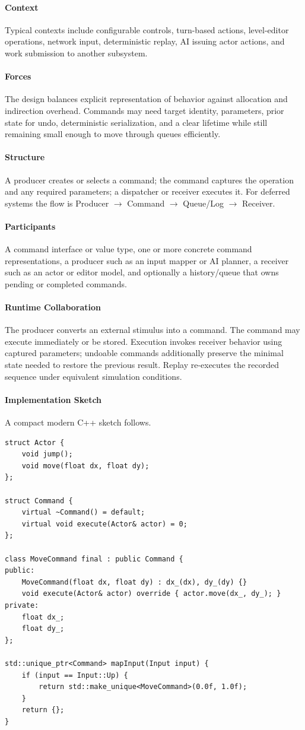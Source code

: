 \documentclass[11pt]{article}
\begin{document}
\paragraph{Context} Typical contexts include configurable controls, turn-based actions, level-editor operations, network input, deterministic replay, AI issuing actor actions, and work submission to another subsystem.
\paragraph{Forces} The design balances explicit representation of behavior against allocation and indirection overhead. Commands may need target identity, parameters, prior state for undo, deterministic serialization, and a clear lifetime while still remaining small enough to move through queues efficiently.
\paragraph{Structure} A producer creates or selects a command; the command captures the operation and any required parameters; a dispatcher or receiver executes it. For deferred systems the flow is Producer $\rightarrow$ Command $\rightarrow$ Queue/Log $\rightarrow$ Receiver.
\paragraph{Participants} A command interface or value type, one or more concrete command representations, a producer such as an input mapper or AI planner, a receiver such as an actor or editor model, and optionally a history/queue that owns pending or completed commands.
\paragraph{Runtime Collaboration} The producer converts an external stimulus into a command. The command may execute immediately or be stored. Execution invokes receiver behavior using captured parameters; undoable commands additionally preserve the minimal state needed to restore the previous result. Replay re-executes the recorded sequence under equivalent simulation conditions.
\paragraph{Implementation Sketch} A compact modern C++ sketch follows.
\begin{lstlisting}
struct Actor {
    void jump();
    void move(float dx, float dy);
};

struct Command {
    virtual ~Command() = default;
    virtual void execute(Actor& actor) = 0;
};

class MoveCommand final : public Command {
public:
    MoveCommand(float dx, float dy) : dx_(dx), dy_(dy) {}
    void execute(Actor& actor) override { actor.move(dx_, dy_); }
private:
    float dx_;
    float dy_;
};

std::unique_ptr<Command> mapInput(Input input) {
    if (input == Input::Up) {
        return std::make_unique<MoveCommand>(0.0f, 1.0f);
    }
    return {};
}
\end{lstlisting}
\end{document}
